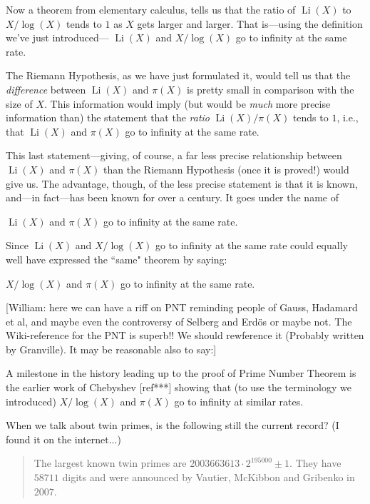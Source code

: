 \documentclass[11pt]{article}
\DeclareMathOperator{\Li}{Li}
\theoremstyle{plain}
\theoremstyle{definition}
\numberwithin{equation}{section}
\numberwithin{figure}{section}
\numberwithin{table}{section}
\begin{document}
Now a theorem from elementary calculus, tells us that the ratio of
$\Li(X)$ to $X/\log(X)$ tends to $1$ as $X$ gets larger and larger.
That is---using the definition we've just introduced--- $\Li(X)$ and
$X/\log(X)$ go to infinity at the same rate.
  
The Riemann Hypothesis, as we have just formulated it, would tell us
that the {\it difference} between $\Li(X)$ and $\pi(X)$ is pretty small
in comparison with the size of $X$. This information would imply (but
would be {\it much} more precise information than) the statement that
the {\it ratio} $\Li(X)/\pi(X)$ tends to $1$, i.e., that $\Li(X)$ and
$\pi(X)$ go to infinity at the same rate.

This last statement---giving, of course, a far less precise
relationship between $\Li(X)$ and $\pi(X)$ than the Riemann Hypothesis
(once it is proved!) would give us.  The advantage, though, of the
less precise statement is that it is known, and---in fact---has been
known for over a century. It goes under the name of
  
\vskip10pt
  $\Li(X)$ and $\pi(X)$ go to infinity at the same rate.
   \vskip10pt

   Since $\Li(X)$ and $X/\log(X)$ go to infinity at the same rate could
   equally well have expressed the ``same" theorem by saying:

  \vskip10pt
   $X/\log(X)$ and $\pi(X)$ go to infinity at the same rate.
   \vskip10pt
    
   [William: here we can have a riff on PNT reminding people of Gauss,
   Hadamard et al, and maybe even the controversy of Selberg and
   Erd{\"o}s or maybe not. The Wiki-reference for the PNT is superb!!
   We should rewference it (Probably written by Granville).  It may be
   reasonable also to say:]

        \vskip10pt
        
        A milestone in the history leading up to the proof of Prime
        Number Theorem is the earlier work of Chebyshev [ref***]
        showing that (to use the terminology we introduced)
        $X/\log(X)$ and $\pi(X)$ go to infinity at similar rates.
        \vskip15pt

 When we talk about twin primes, is the following still the
        current record? (I found it on the internet...)

        \begin{quote} The largest known twin primes are
          $2003663613\cdot 2^{195000} \pm 1$. They have $58711$ digits
          and were announced by Vautier, McKibbon and Gribenko in
          $2007$.
      \end{quote}
\end{document}
